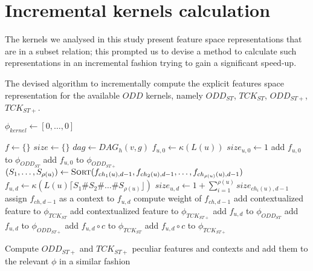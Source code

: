 \section{Incremental kernels calculation} 
\label{sec:inc}
The kernels we analysed in this study present feature space representations
that are in a subset relation; this prompted us to devise a method to calculate
such representations in an incremental fashion trying to gain a significant
speed-up.

\begin{algorithm}
    \caption{The devised algorithm to incrementally compute the explicit
    features space representation for the available $ODD$ kernels, namely
    $ODD_{ST}$, $TCK_{ST}$, $ODD_{ST+}$, $TCK_{ST+}$.}
    \label{alg:incremental}
    \begin{algorithmic}[1]
            \State $\phi_{kernel} \gets [0,\dots,0]$
        \EndFor

            \State $f \gets \{\}$
            \State $size \gets \{\}$
            \State $dag \gets DAG_h(v, g)$
                        \State $f_{u,0} \gets \kappa(L(u))$
                        \State $size_{u,0} \gets 1$
                        \State add $f_{u,0}$ to $\phi_{ODD_{ST}}$
                        \State add $f_{u,0}$ to $\phi_{ODD_{ST+}}$
                    \Else
                        \State $(S_1,\dots,S_{\rho(u)}) \gets \Call{Sort}{
                        f_{ch_1(u),d-1},f_{ch_2(u),d-1},\dots,f_{ch_{\rho(u)}(u),d-1}}$
                        \State $f_{u,d} \gets \kappa(L(u)\lceil{}S_1\#S_2\#\dots\#S_{\rho(u)}\rfloor)$
                        \State $size_{u,d} \gets 1 + \sum_{i=1}^{\rho(u)}size_{ch_i(u),d-1}$
                            \State assign $f_{ch,d-1}$ as a context to $f_{u,d}$
                            \State compute weight of $f_{ch,d-1}$
                            \State add contextualized feature to $\phi_{TCK_{ST}}$
                            \State add contextualized feature to $\phi_{TCK_{ST+}}$
                        \EndFor
                        \State add $f_{u,d}$ to $\phi_{ODD_{ST}}$
                        \State add $f_{u,d}$ to $\phi_{ODD_{ST+}}$
                    \EndIf
                        \State add $f_{u,d}\circ{}c$ to $\phi_{TCK_{ST}}$
                        \State add $f_{u,d}\circ{}c$ to $\phi_{TCK_{ST+}}$
                    \EndIf

                    \State Compute $ODD_{ST+}$ and $TCK_{ST+}$ peculiar features
                    and contexts and add them to the relevant $\phi$ in a similar
                    fashion\label{line:stp}
                \EndFor
            \EndFor
        \EndFor
    \end{algorithmic}
\end{algorithm}

